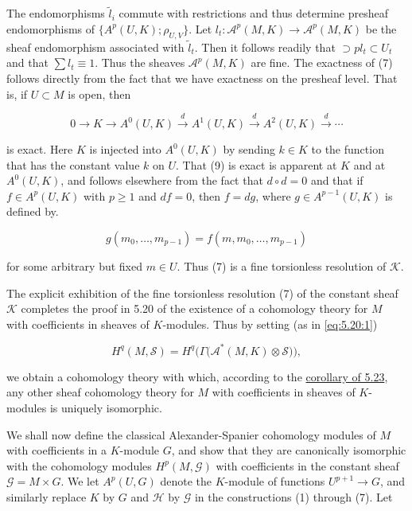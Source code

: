 The endomorphisms $\tilde{l}_i$ commute with restrictions and thus determine presheaf endomorphisms of  $ \{A^p(U,K);\rho_{U,V}\} $. Let  $ l_t: \mathcal{A}^p(M,K) \to \mathcal{A}^p(M,K) $ be the sheaf endomorphism associated with  $ \widetilde{l}_t $. Then it follows readily that  $ \supset p l_t \subset U_t $ and that  $ \sum l_t \equiv 1 $. Thus the sheaves  $ \mathcal{A}^p(M,K) $ are fine. The exactness of (7) follows directly from the fact that we have exactness on the presheaf level. That is, if  $ U \subset M $ is open, then

\begin{equation}
\tag{9}\label{eq:5.26:9}
0\to K\to A^{0}(U,K)\xrightarrow{d}A^{1}(U,K)\xrightarrow{d}A^{2}(U,K)\xrightarrow{d}\cdots
\end{equation}

is exact. Here $K$ is injected into $A^0(U,K)$ by sending $k \in K$ to the function that has the constant value $k$ on $U$. That (9) is exact is apparent at $K$ and at $A^0(U,K)$, and follows elsewhere from the fact that $d \circ d = 0$ and that if $f \in A^p(U,K)$ with $p \geq 1$ and $df = 0$, then $f = dg$, where $g \in A^{p-1}(U,K)$ is defined by.

\begin{equation}
\tag{10}\label{eq:5.26:10}
g(m_{0},\ldots,m_{p-1})=f(m,m_{0},\ldots,m_{p-1})
\end{equation}

for some arbitrary but fixed  $ m \in U $. Thus (7) is a fine torsionless resolution of $\mathcal{K}$.

The explicit exhibition of the fine torsionless resolution (7) of the constant sheaf $\mathcal{K}$ completes the proof in 5.20 of the existence of a cohomology theory for $M$ with coefficients in sheaves of $K$-modules. Thus by setting (as in \eqref{eq:5.20:1})

\begin{equation}
\tag{11}\label{eq:5.26:11}
H^{q}(M,\mathcal{S})=H^{q}\big(\Gamma\big(\mathcal{A}^{*}(M,K)\otimes\mathcal{S}\big)\big),
\end{equation}

we obtain a cohomology theory with which, according to the \hyperref[thm:5.23]{corollary of 5.23}, any other sheaf cohomology theory for $M$ with coefficients in sheaves of $K$-modules is uniquely isomorphic.

We shall now define the classical Alexander-Spanier cohomology modules of $M$ with coefficients in a $K$-module $G$, and show that they are canonically isomorphic with the cohomology modules $H^p(M,\mathcal{G})$ with coefficients in the constant sheaf $\mathcal{G}=M\times G$. We let $A^p(U,G)$ denote the $K$-module of functions $U^{p+1}\to G$, and similarly replace $K$ by $G$ and $\mathcal{H}$ by $\mathcal{G}$ in the constructions (1) through (7). Let

